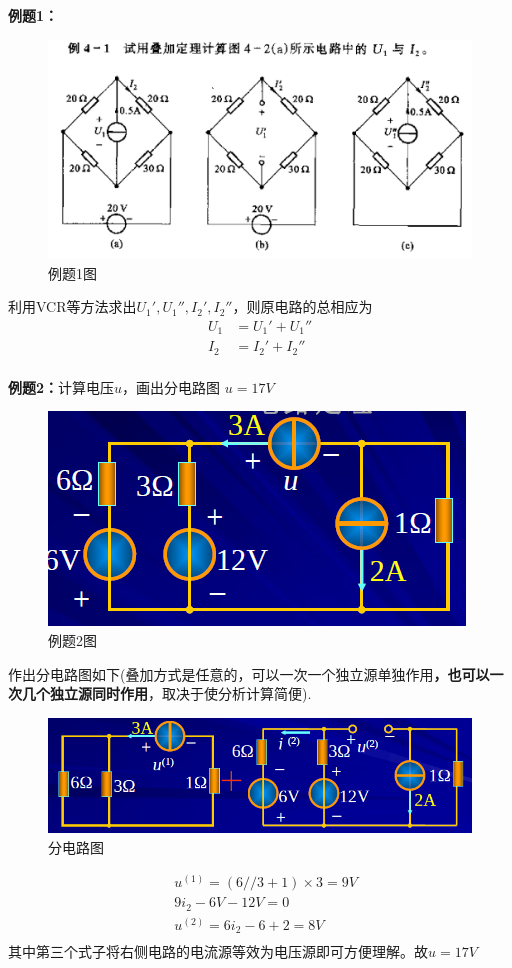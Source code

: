 \documentclass[11pt,a4paper,oneside]{book}
\begin{document}
\noindent\textbf{例题1：}
\begin{figure}[H]
	\centering
	\includegraphics[width=0.7\linewidth]{screenshot047}
	\caption{例题1图}
	\label{fig:screenshot047}
\end{figure}
利用VCR等方法求出$U_1',U_1'',I_2',I_2''$，则原电路的总相应为
\begin{equation}
	\begin{aligned}
		U_1&=U_1'+U_1'' \\
		I_2&=I_2'+I_2'' \\
	\end{aligned}
\end{equation}

\noindent\textbf{例题2：}计算电压$u$，画出分电路图  \quad $u=17V$
\begin{figure}[H]
	\centering
	\includegraphics[width=0.5\linewidth]{screenshot051}
	\caption{例题2图}
	\label{fig:screenshot051}
\end{figure}
作出分电路图如下(叠加方式是任意的，可以一次一个独立源单独作用\textbf{，也可以一次几个独立源同时作用}，取决于使分析计算简便).
\begin{figure}[H]
	\centering
	\includegraphics[width=0.7\linewidth]{screenshot052}
	\caption{分电路图}
	\label{fig:screenshot052}
\end{figure}
\begin{equation}
	\begin{aligned}
		&u^{(1)}=(6//3+1)\times 3=9V \\
		&9i_2-6V-12V=0 \\
		&u^{(2)}=6i_2-6+2=8V \\
	\end{aligned}
\end{equation}
其中第三个式子将右侧电路的电流源等效为电压源即可方便理解。故$u=17V$
\end{document}
